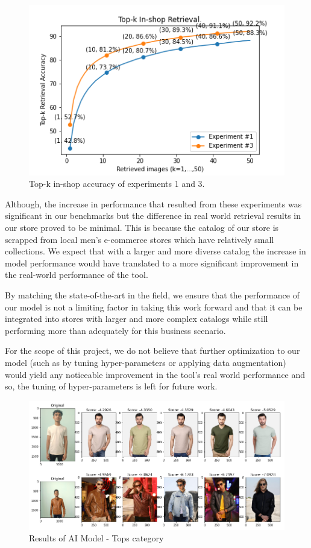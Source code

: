 \begin{figure}[H]
\includegraphics[width=12cm]{images/inshop-retrieval.png} 
\centering
\caption{Top-k in-shop accuracy of experiments 1 and 3.}
\label{architecture}
\end{figure}


Although, the increase in performance that resulted from these experiments was significant in our benchmarks but the difference in real world retrieval results in our store proved to be minimal. This is because the catalog of our store is scrapped from local men’s e-commerce stores which have relatively small collections. We expect that with a larger and more diverse catalog the increase in model performance would have translated to a more significant improvement in the real-world performance of the tool.

By matching the state-of-the-art in the field, we ensure that the performance of our model is not a limiting factor in taking this work forward and that it can be integrated into stores with larger and more complex catalogs while still performing more than adequately for this business scenario.

For the scope of this project, we do not believe that further optimization to our model (such as by tuning hyper-parameters or applying data augmentation) would yield any noticeable improvement in the tool’s real world performance and so, the tuning of hyper-parameters is left for future work.


\begin{figure}[H]
\includegraphics[width=12cm]{images/Recommendations1.PNG} 
\centering
\caption{Results of AI Model - Tops category}
\label{architecture}
\end{figure}


